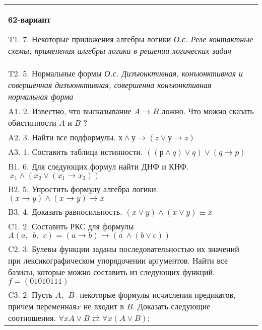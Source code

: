 \documentclass{article}
\begin{document}
\begin{tabular}{m{17cm}}
\textbf{62-вариант}
\newline

T1. 7. Некоторые приложения алгебры логики \emph{О.с. Реле контактные схемы, применения алгебры логики в решении логических задач} \\
T2. 5. Нормальные формы \emph{О.с. Дизъюнктивная, конъюнктивная и совершенная дизъюнктивная, совершенна конъюнктивная нормальная форма} \\
A1. 2. Известно, что высказывание \(A \rightarrow B\) ложно. Что можно сказать обистинности \(A\) и \(B\) ? \\
A2. 3. Найти все подформулы. \(х \land у \rightarrow (z \vee у \rightarrow z)\) \\
A3. 1. Составить таблица истинности. \(\left( (р \land q) \vee q \right) \vee (q \rightarrow p)\) \\
B1. 6. Для следующих формул найти ДНФ и КНФ. \(\ x_{1} \land (x_{2} \vee (x_{1} \rightarrow x_{3}))\) \\
B2. 5. Упростить формулу алгебра логики. \((x \rightarrow y) \land (x \rightarrow \overline{y}) \rightarrow \overline{x}\) \\
B3. 4. Доказать равносильность. \((x \vee y) \land (x \vee \overline{y}) \equiv x\) \\
C1. 2. Составить РКС для формулы \(A(a,\ \ b,\ \ c) = (a \rightarrow b) \rightarrow (\overline{a}\  \land (b \vee c))\) \\
C2. 3. Булевы функции заданы последовательностью их значений при лексикографическом упорядочении аргументов. Найти все базисы, которые можно составить из следующих функций. \(f = (01010111)\) \\
C3. 2. Пусть \(A,\ \ B\)- некоторые формулы исчисления предикатов, причем переменная\(x\) не входит в \(B\). Доказать следующие соотношения. \(\forall xA \vee B \rightleftarrows \forall x(A \vee B)\); \\

\end{tabular}
\vspace{1cm}
\end{document}
